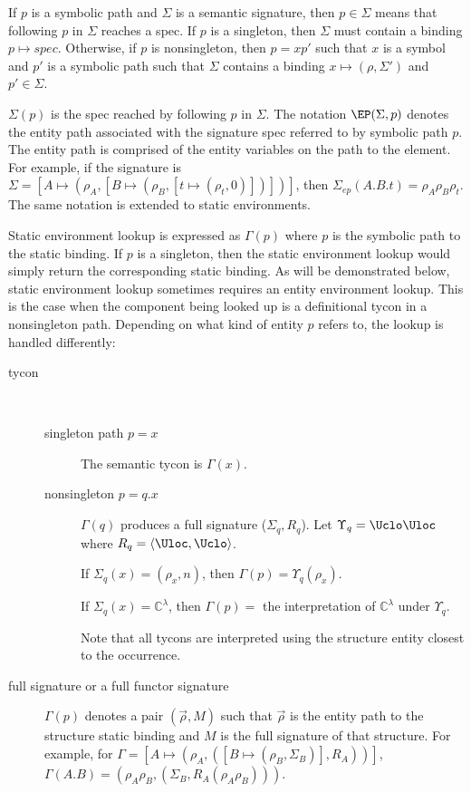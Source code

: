 \documentclass[9pt,nocopyrightspace, fleqn]{sigplanconf}
\begin{document}
If $p$ is a symbolic path and $\Sigma$ is a semantic signature, then $p\in\Sigma$ means that following $p$ in $\Sigma$ reaches a spec. If $p$ is a singleton, then $\Sigma$ must contain a binding $p\mapsto spec$. Otherwise, if $p$ is nonsingleton, then $p=xp'$ such that $x$ is a symbol and $p'$ is a symbolic path such that $\Sigma$ contains a binding $x\mapsto (\rho,\Sigma')$ and $p'\in\Sigma$. 

$\Sigma(p)$ is the spec reached by following $p$ in $\Sigma$. The notation $\EP(\Sigma,p)$ denotes the entity path associated with the signature spec referred to by symbolic path $p$. The entity path is comprised of the entity variables on the path to the element. For example, if the signature is $\Sigma = [A\mapsto(\rho_A,[B\mapsto (\rho_B, [t \mapsto (\rho_t, 0)])])]$, then $\Sigma_{ep}(A.B.t) = \rho_A\rho_B\rho_t$. The same notation is extended to static environments. 

Static environment lookup is expressed as $\Gamma(p)$ where $p$ is the symbolic path to the static binding. If $p$ is a singleton, then the static environment lookup would simply return the corresponding static binding. As will be demonstrated below, static environment lookup sometimes requires an entity environment lookup. This is the case when the component being looked up is a definitional tycon in a nonsingleton path. Depending on what kind of entity $p$ refers to, the lookup is handled differently:
\begin{description}
\item[tycon]~
\begin{description}
\item[singleton path $p=x$] The semantic tycon is $\Gamma(x)$.
\item[nonsingleton $p=q.x$] $\Gamma(q)$ produces a full signature ($\Sigma_q,R_q$). Let $\Upsilon_q = \Uclo\Uloc$ where $R_q = \langle \Uloc, \Uclo\rangle$. 

If $\Sigma_q(x) = (\rho_x,n)$, then $\Gamma(p) = \Upsilon_q(\rho_x)$. 

If $\Sigma_q(x) = \mathbb{C}^\lambda$, then $\Gamma(p) = $ the interpretation of $\mathbb{C}^\lambda$ under $\Upsilon_q$. 

Note that all tycons are interpreted using the structure entity closest to the occurrence. 
\end{description}
\item[full signature or a full functor signature] $\Gamma(p)$ denotes a pair $(\vec{\rho}, M)$ such that $\vec{\rho}$ is the entity path to the structure static binding and $M$ is the full signature of that structure. For example, for $\Gamma=[A\mapsto(\rho_A,([B\mapsto(\rho_B, \Sigma_B)], R_A))]$, $\Gamma(A.B) = (\rho_A\rho_B, (\Sigma_B,R_A(\rho_A\rho_B)))$. 
\end{description}
\end{document}
